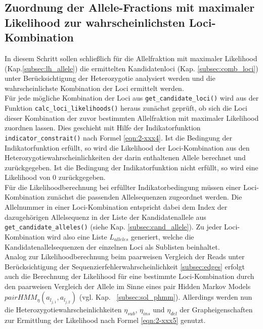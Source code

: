 \subsection{Zuordnung der Allele-Fractions mit maximaler Likelihood zur wahrscheinlichsten Loci-Kombination} \label{subsec:lh_loci}

In diesem Schritt sollen schließlich für die Allelfraktion mit maximaler Likelihood (Kap.\ref{subsec:lh_allele}) die ermittelten Kandidatenloci (Kap. \ref{subsec:comb_loci}) unter Berücksichtigung der Heterozygotie analysiert werden und die wahrscheinlichste Kombination der Loci ermittelt werden.\\

Für jede mögliche Kombination der Loci aus \lstinline|get_candidate_loci()| wird aus der Funktion \lstinline|calc_loci_likelihoods()| heraus zunächst geprüft, ob sich die Loci dieser Kombination der zuvor bestimmten Allelfraktion mit maximaler Likelihood zuordnen lassen. Dies geschieht mit Hilfe der Indikatorfunktion \lstinline|indicator_constrait()| nach Formel \eqref{eqn:2-xxx4}. Ist die Bedingung der Indikatorfunktion erfüllt, so wird die Likelihood der Loci-Kombination aus den Heterozygotiewahrscheinlichkeiten der darin enthaltenen Allele berechnet und zurückgegeben. Ist die Bedingung der Indikatorfunktion nicht erfüllt, so wird eine Likelihood von 0 zurückgegeben.\\

Für die Likelihoodberechnung bei erfüllter Indikatorbedingung müssen einer Loci-Kombination zunächst die passenden Allelsequenzen zugeordnet werden. Die Allelnummer in einer Loci-Kombination entspricht dabei dem Index der dazugehörigen Allelsequenz in der Liste der Kandidatenallele aus \lstinline|get_candidate_alleles()| (siehe Kap. \ref{subsec:cand_allele}). Zu jeder Loci-Kombination wird also eine Liste $ L_{alleles} $ generiert, welche die Kandidatenallelsequenzen der einzelnen Loci als Sublisten beinhaltet.\\

Analog zur Likelihoodberechnung beim paarweisen Vergleich der Reads unter Berücksichtigung der Sequenzierfehlerwahrscheinlichkeit \ref{subsec:edges} erfolgt auch die Berechnung der Likelihood für eine bestimmte Loci-Kombination durch den paarweisen Vergleich der Allele im Sinne eines pair Hidden Markov Models $ pairHMM_{\eta}(a_{l_{j,1}}, a_{l_{j,2}}) $ (vgl. Kap. ~\ref{subsec:sol_phmm}). Allerdings werden nun die Heterozygotiewahrscheinlichkeiten $\eta_{sub}$, $\eta_{ins}$ und $\eta_{del}$ der Grapheigenschaften zur Ermittlung der Likelihood nach Formel \eqref{eqn:2-xxx5} genutzt.  \\

